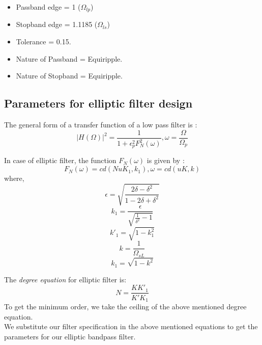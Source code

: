 \documentclass{article}
\begin{document}
\begin{itemize}
    \item Passband edge = 1 ($\Omega_{lp}$)
    \item Stopband edge = 1.1185 ($\Omega_{ls}$)
    \item Tolerance = 0.15.
    \item Nature of Passband = Equiripple.
    \item Nature of Stopband = Equiripple.
\end{itemize}

\subsection{Parameters for elliptic filter design}
 The general form of a transfer function of a low pass filter is :
 \begin{equation}
     |H(\Omega)|^{2} = \frac{1}{1 + \epsilon _{p}^{2}F_{N}^{2}(\omega)}, \omega = \frac{\Omega}{\Omega_{p}}
 \end{equation}

 In case of elliptic filter, the function $F_{N}(\omega)$ is given by :
 \begin{equation}
     F_{N}(\omega) = cd(NuK_{1}, k_{1}), \omega = cd(uK, k)
 \end{equation}
where,
\begin{equation}
    \epsilon = \sqrt{\frac{2\delta - \delta^{2}}{1-2\delta+\delta^{2}}}
\end{equation}
\begin{equation}
    k_{1} = \frac{\epsilon}{\sqrt{\frac{1}{\delta^{2}}-1}}
\end{equation}
\begin{equation}
    k'_{1} = \sqrt{1-k_{1}^{2}}
\end{equation}
\begin{equation}
    k = \frac{1}{\Omega_{sL}}
\end{equation}
\begin{equation}
    k_{1} = \sqrt{1-k^{2}}
\end{equation}

 The \emph{degree equation} for elliptic filter is:
 \begin{equation}
     N = \frac{KK'_{1}}{K'K_{1}}
 \end{equation}
 To get the minimum order, we take the ceiling of the above mentioned degree equation.\\

We substitute our filter specification in the above mentioned equations to get the parameters for our elliptic bandpass filter.\\
\end{document}
